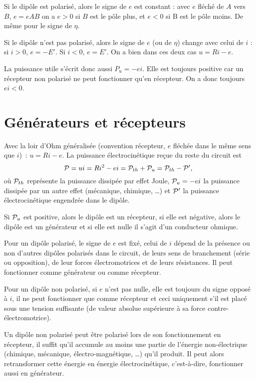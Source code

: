 Si le dipôle est polarisé, alors le signe de \(e\) est constant : avec \(e\) 
fléché de \(A\) vers \(B\), \(e = eAB\) on a \(e > 0\) si \(B\) est le pôle 
plus, et \(e < 0\) si B est le pôle moins. De même pour le signe de \(\eta\).

Si le dipôle n'est pas polarisé, alors le signe de \(e\) (ou de \(\eta\)) 
change avec celui de \(i\) : si \(i > 0\), \(e = -E'\). Si \(i < 0\), \(e = 
E'\). On a bien dans ces deux cas \(u = R i - e\).

La puissance utile s'écrit donc aussi \(P_u = - e i\). Elle est toujours 
positive car un récepteur non polarisé ne peut fonctionner qu'en récepteur. On 
a donc toujours \(ei < 0\).

\section{Générateurs et récepteurs}%
Avec la loir d'Ohm généralisée (convention récepteur, \(e\) fléchée dans le 
même sens que \(i\))~: \(u=Ri-e\). La puissance électrocinétique reçue du reste 
du circuit est
\begin{equation}%
  \P = ui = Ri^2 - ei = \P_{th}+ \P_u = \P_{th} - \P',
\end{equation}%
où \(\P_{th}\) représente la puissance dissipée par effet Joule, \(\P_u=-ei\) 
la puissance dissipée par un autre effet (mécanique, chimique, \ldots{}) et 
\(\P'\) la puissance électrocinétique engendrée dans le dipôle.

Si \(\P_u\) est positive, alors le dipôle est un récepteur, si elle est 
négative, alors le dipôle est un générateur et si elle est nulle il s'agit d'un 
conducteur ohmique.

Pour un dipôle polarisé, le signe de \(e\) est fixé, celui de \(i\) dépend de 
la présence ou non d'autres dipôles polarisés dans le circuit, de leurs sens de 
branchement (série ou opposition), de leur forces électromotrices et de leurs 
résistances. Il peut fonctionner comme générateur ou comme récepteur.

Pour un dipôle non polarisé, si \(e\) n'est pas nulle, elle est toujours du 
signe opposé à \(i\), il ne peut fonctionner que comme récepteur et ceci 
uniquement s'il est placé sous une tension suffisante (de valeur absolue 
supérieure à sa force contre-électromotrice).

Un dipôle non polarisé peut être polarisé lors de son fonctionnement en 
récepteur, il suffit qu'il accumule au moins une partie de l'énergie 
non-électrique (chimique, mécanique, électro-magnétique, \ldots{}) qu'il 
produit. Il peut alors retransformer cette énergie en énergie électrocinétique, 
c'est-à-dire, fonctionner aussi en générateur.

